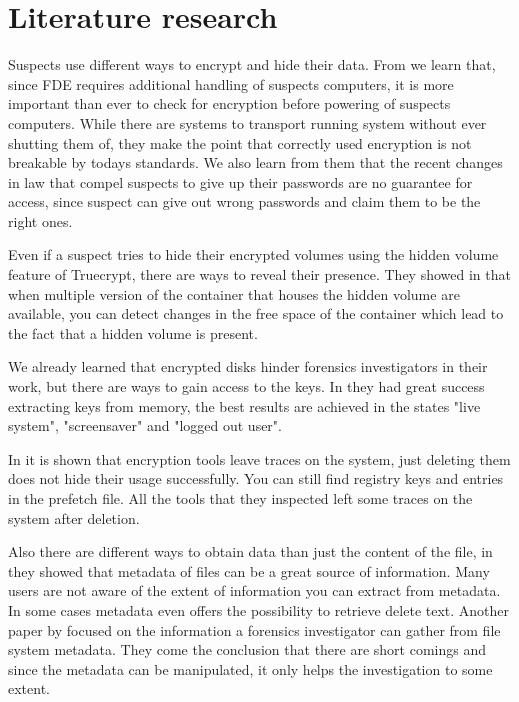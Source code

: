 \section{Literature research}

Suspects use different ways to encrypt and hide their data. From \cite{Casey2011129} we learn that, since \gls{FDE} requires additional handling of suspects computers, it is more important than ever to check for encryption before powering of suspects computers. While there are systems to transport running system without ever shutting them of, they make the point that correctly used encryption is not breakable by todays standards.  We also learn from them that the recent changes in law that compel suspects to give up their passwords are no guarantee for access, since suspect can give out wrong passwords and claim them to be the right ones. 

Even if a suspect tries to hide their encrypted volumes using the hidden volume feature of Truecrypt, there are ways to reveal their presence.  They showed in \cite{Hargreaves2010} that when multiple version of the container that houses the hidden volume are available, you can detect changes in the free space of the container which lead to the fact that a hidden volume is present.

We already learned that encrypted disks hinder forensics investigators in their work, but there are ways to gain access to the keys. In \cite{MaartmannMoe2009S132} they had great success extracting keys from memory, the best results are achieved in the states "live system", "screensaver" and "logged out user".

In \cite{5563320} it is shown that encryption tools leave traces on the system, just deleting them does not hide their usage successfully. You can still find registry keys and entries in the prefetch file. All the tools that they inspected left some traces on the system after deletion.

Also there are different ways to obtain data than just the content of the file, in \cite{Castiglione2007750} they showed that metadata of files can be a great source of information. Many users are not aware of the extent of information you can extract from metadata. In some cases metadata even offers the possibility to retrieve delete text. Another paper by \cite{Buchholz2004298} focused on the information a forensics investigator can gather from file system metadata. They come the conclusion that there are short comings and since the metadata can be manipulated, it only helps the investigation to some extent.

